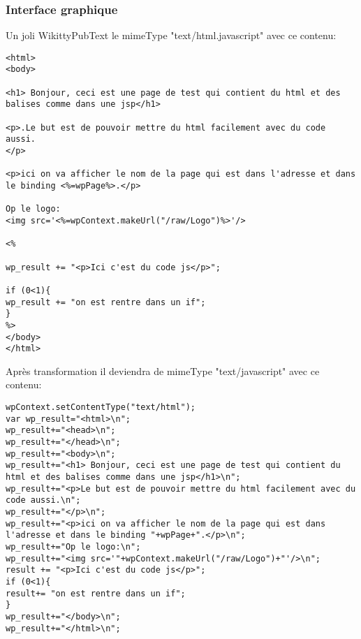 \subsubsection*{Interface graphique}

Un joli WikittyPubText le mimeType "text/html.javascript" avec ce contenu:

\begin{lstlisting}
<html>
<body>

<h1> Bonjour, ceci est une page de test qui contient du html et des balises comme dans une jsp</h1>

<p>.Le but est de pouvoir mettre du html facilement avec du code aussi.
</p>

<p>ici on va afficher le nom de la page qui est dans l'adresse et dans le binding <%=wpPage%>.</p>

Op le logo:
<img src='<%=wpContext.makeUrl("/raw/Logo")%>'/>

<%

wp_result += "<p>Ici c'est du code js</p>";

if (0<1){
wp_result += "on est rentre dans un if";
}
%>
</body>
</html>
\end{lstlisting}

Après transformation il deviendra de mimeType "text/javascript" avec ce contenu:

\begin{lstlisting}
wpContext.setContentType("text/html");
var wp_result="<html>\n";
wp_result+="<head>\n";
wp_result+="</head>\n";
wp_result+="<body>\n";
wp_result+="<h1> Bonjour, ceci est une page de test qui contient du html et des balises comme dans une jsp</h1>\n";
wp_result+="<p>Le but est de pouvoir mettre du html facilement avec du code aussi.\n";
wp_result+="</p>\n";
wp_result+="<p>ici on va afficher le nom de la page qui est dans l'adresse et dans le binding "+wpPage+".</p>\n";
wp_result+="Op le logo:\n";
wp_result+="<img src='"+wpContext.makeUrl("/raw/Logo")+"'/>\n";
result += "<p>Ici c'est du code js</p>";
if (0<1){
result+= "on est rentre dans un if";
}
wp_result+="</body>\n";
wp_result+="</html>\n";
\end{lstlisting}


